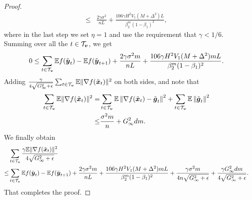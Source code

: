 \begin{proof}
\begin{align*}
    \leq & \frac{2\gamma\sigma^2}{nL} +  \frac{106\gamma H^2V_1(M+\Delta^2)L}{\beta_2^m(1-\beta_1)^2},
\end{align*}
where in the last step we set $\eta=1$ and use the requirement that $\gamma<1/6$. Summing over all the $t\in\mathcal{T}_{\boldsymbol{v}}$, we get
\begin{align*}
    0\leq \sum_{t\in\mathcal{T}_{\boldsymbol{v}}}\mathbb E f(\tilde{\boldsymbol{y}}_{t}) - \mathbb Ef(\tilde{\boldsymbol{y}}_{t+1}) + \frac{2\gamma\sigma^2m}{nL} +  \frac{106\gamma H^2V_1(M+\Delta^2)mL}{\beta_2^m(1-\beta_1)^2}.
\end{align*}
Adding $\frac{\gamma}{4\sqrt{G_\infty^2+\epsilon}}\sum_{t\in\mathcal{T}_{\boldsymbol{v}}}\mathbb{E}\|\nabla f(\tilde{\boldsymbol{x}}_t)\|^2$ on both sides, and note that
\begin{align*}
    \sum_{t\in\mathcal{T}_{\boldsymbol{v}}}\mathbb{E}\|\nabla f(\tilde{\boldsymbol{x}}_t)\|^2 = & \sum_{t\in\mathcal{T}_{\boldsymbol{v}}}\mathbb E\left\|\nabla f(\tilde{\boldsymbol{x}}_t) - \tilde{\boldsymbol{g}}_t\right\|^2 + \sum_{t\in\mathcal{T}_{\boldsymbol{v}}}\mathbb E\left\|\tilde{\boldsymbol{g}}_t\right\|^2 \\
\leq & \frac{\sigma^2m}{n} + G_\infty^2dm.
\end{align*}
We finally obtain
\begin{align*}
    & \sum_{t\in\mathcal{T}_{\boldsymbol{v}}}\frac{\gamma\mathbb{E}\|\nabla f(\tilde{\boldsymbol{x}}_t)\|^2}{4\sqrt{G_\infty^2+\epsilon}} \\
    \leq & \sum_{t\in\mathcal{T}_{\boldsymbol{v}}}\mathbb E f(\tilde{\boldsymbol{y}}_{t}) - \mathbb Ef(\tilde{\boldsymbol{y}}_{t+1}) + \frac{2\gamma\sigma^2m}{nL} +  \frac{106\gamma H^2V_1(M+\Delta^2)mL}{\beta_2^m(1-\beta_1)^2} + \frac{\gamma\sigma^2m}{4n\sqrt{G_\infty^2+\epsilon}} + \frac{\gamma G_\infty^2dm}{4\sqrt{G_\infty^2+\epsilon}}.
\end{align*}
That completes the proof.
\end{proof}